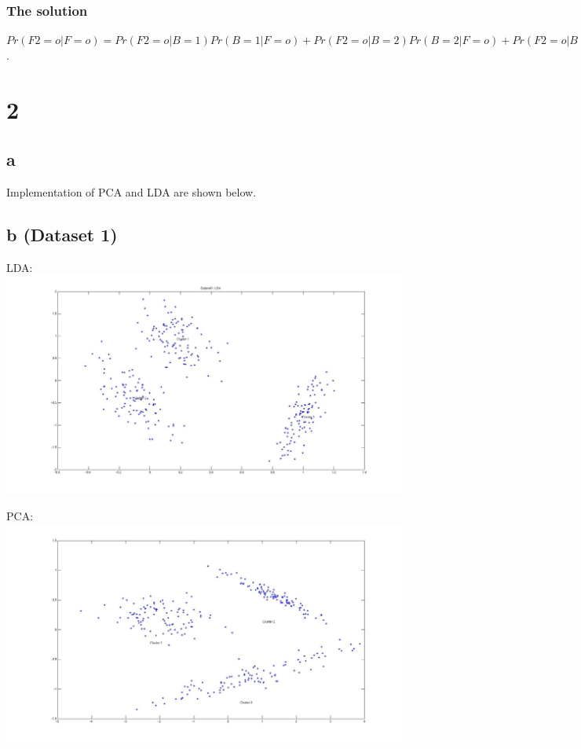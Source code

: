 \documentclass{article}
\begin{document}
\subsubsection{The solution}
$Pr(F2=o|F=o) = Pr(F2=o|B=1)Pr(B=1|F=o) + Pr(F2=o|B=2)Pr(B=2|F=o) + Pr(F2=o|B=3)Pr(B=3|F=o) = .3*0.1765 + .5*0.294 + .3*0.53 = 0.359$.


\section{2}
\subsection{a}
Implementation of PCA and LDA are shown below.




\subsection{b (Dataset 1)}
LDA:\\
\includegraphics[scale=.2]{images/dataset1lda.jpg}

PCA:\\
\includegraphics[scale=.2]{images/dataset1pca.jpg}
\end{document}
